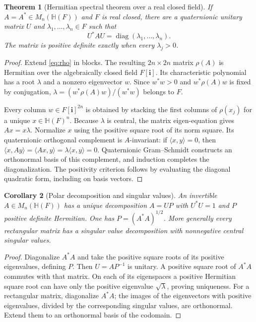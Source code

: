\documentclass[11pt,letterpaper]{article}
\newtheorem{theorem}{Theorem}[section]
\newtheorem{corollary}[theorem]{Corollary}
\theoremstyle{definition}
\newcommand{\HH}{\mathbb H}
\newcommand{\ii}{\mathbf i}
\begin{document}
\begin{theorem}[Hermitian spectral theorem over a real closed field]
\label{thm:spectral}
If $A=A^*\in M_n(\HH(F))$ and $F$ is real closed, there are a quaternionic unitary
matrix $U$ and $\lambda_1,\ldots,\lambda_n\in F$ such that
\[
 U^*AU=\operatorname{diag}(\lambda_1,\ldots,\lambda_n).
\]
The matrix is positive definite exactly when every $\lambda_j>0$.
\end{theorem}
\begin{proof}
Extend \eqref{eq:rho} in blocks. The resulting $2n\times2n$ matrix $\rho(A)$ is
Hermitian over the algebraically closed field $F[\ii]$. Its characteristic
polynomial has a root $\lambda$ and a nonzero eigenvector $w$. Since
$w^*w>0$ and $w^*\rho(A)w$ is fixed by conjugation,
$\lambda=(w^*\rho(A)w)/(w^*w)$ belongs to $F$.

Every column $w\in F[\ii]^{2n}$ is obtained by stacking the first columns of
$\rho(x_j)$ for a unique $x\in\HH(F)^n$. Because $\lambda$ is central, the
matrix eigen-equation gives $Ax=x\lambda$. Normalize $x$ using the positive
square root of its norm square. Its quaternionic orthogonal complement is
$A$-invariant: if $\langle x,y\rangle=0$, then
$\langle x,Ay\rangle=\langle Ax,y\rangle=\lambda\langle x,y\rangle=0$.
Quaternionic Gram--Schmidt constructs an orthonormal basis of this complement,
and induction completes the diagonalization. The positivity criterion follows
by evaluating the diagonal quadratic form, including on basis vectors.
\end{proof}

\begin{corollary}[Polar decomposition and singular values]
An invertible $A\in M_n(\HH(F))$ has a unique decomposition
$A=UP$ with $U^*U=1$ and $P$ positive definite Hermitian. One has
$P=(A^*A)^{1/2}$. More generally every rectangular matrix has a singular value
decomposition with nonnegative central singular values.
\end{corollary}
\begin{proof}
Diagonalize $A^*A$ and take the positive square roots of its positive
eigenvalues, defining $P$. Then $U=AP^{-1}$ is unitary. A positive square root
of $A^*A$ commutes with that matrix. On each of its eigenspaces a positive
Hermitian square root can have only the positive eigenvalue $\sqrt\lambda$,
proving uniqueness. For a rectangular matrix, diagonalize $A^*A$; the images of
the eigenvectors with positive eigenvalues, divided by the corresponding
singular values, are orthonormal. Extend them to an orthonormal basis of the
codomain.
\end{proof}
\end{document}
